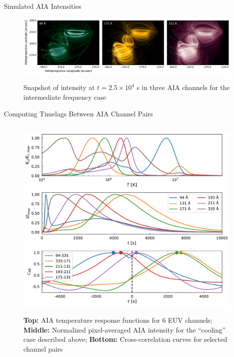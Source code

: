\documentclass[final,12pt]{beamer}
\begin{document}
\begin{frame}
\begin{columns}[T]
\begin{column}{0.49\linewidth}
\begin{block}{Simulated AIA Intensities}
      \vspace{-2ex}
      \begin{figure}
      \includegraphics{../figures/aia_intensity_maps}
      \label{fig:intensity_maps}
      \caption{Snapshot of intensity at $t=2.5\times10^4$ s in three AIA channels for the intermediate frequency case}
      \end{figure}
      \vspace{-2.5ex}
    \end{block}
    \begin{block}{Computing Timelags Between AIA Channel Pairs}
      \vspace{-4ex}
      \begin{columns}[c]
        \begin{column}{0.53\columnwidth}
          \begin{figure}
            \includegraphics{../figures/timeseries_timelags_1d}
            \label{fig:timelags_1d}
            \caption{\textbf{Top:} AIA temperature response functions for 6 EUV channels; \textbf{Middle:} Normalized pixel-averaged AIA intensity for the ``cooling'' case described above; \textbf{Bottom:} Cross-correlation curves for selected channel pairs}

\end{figure}
\end{column}
\end{columns}
\end{block}
\end{column}
\end{columns}
\end{frame}
\end{document}
